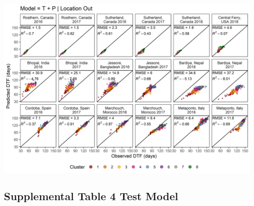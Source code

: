 \documentclass[
]{article}
\begin{document}
\includegraphics{Additional/Model/Model_2_3.png}

\hypertarget{supplemental-table-4-test-model}{%
\subsection{Supplemental Table 4 Test
Model}\label{supplemental-table-4-test-model}}
\end{document}
